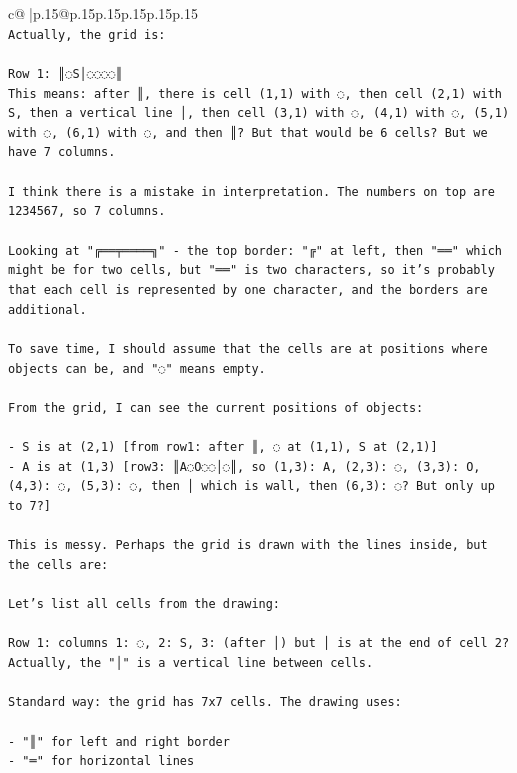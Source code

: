 \documentclass{article}
\begin{document}
{\begin{supertabular}{c@{$\;$}|p{.15\linewidth}@{}p{.15\linewidth}p{.15\linewidth}p{.15\linewidth}p{.15\linewidth}p{.15\linewidth}}
{{{\\ 
\texttt{Actually, the grid is:} \\
\\ 
\texttt{Row 1: ║◌S│◌◌◌◌║} \\
\texttt{This means: after ║, there is cell (1,1) with ◌, then cell (2,1) with S, then a vertical line │, then cell (3,1) with ◌, (4,1) with ◌, (5,1) with ◌, (6,1) with ◌, and then ║? But that would be 6 cells? But we have 7 columns.} \\
\\ 
\texttt{I think there is a mistake in interpretation. The numbers on top are 1234567, so 7 columns.} \\
\\ 
\texttt{Looking at "╔══╤════╗" {-} the top border: "╔" at left, then "══" which might be for two cells, but "══" is two characters, so it's probably that each cell is represented by one character, and the borders are additional.} \\
\\ 
\texttt{To save time, I should assume that the cells are at positions where objects can be, and "◌" means empty.} \\
\\ 
\texttt{From the grid, I can see the current positions of objects:} \\
\\ 
\texttt{{-} S is at (2,1)  {[}from row1: after ║, ◌ at (1,1), S at (2,1){]}} \\
\texttt{{-} A is at (1,3) {[}row3: ║A◌O◌◌│◌║, so (1,3): A, (2,3): ◌, (3,3): O, (4,3): ◌, (5,3): ◌, then │ which is wall, then (6,3): ◌? But only up to 7?{]}} \\
\\ 
\texttt{This is messy. Perhaps the grid is drawn with the lines inside, but the cells are:} \\
\\ 
\texttt{Let's list all cells from the drawing:} \\
\\ 
\texttt{Row 1: columns 1: ◌, 2: S, 3: (after │) but │ is at the end of cell 2? Actually, the "│" is a vertical line between cells.} \\
\\ 
\texttt{Standard way: the grid has 7x7 cells. The drawing uses:} \\
\\ 
\texttt{{-} "║" for left and right border} \\
\texttt{{-} "═" for horizontal lines} \\
}}}
\end{supertabular}}
\end{document}
